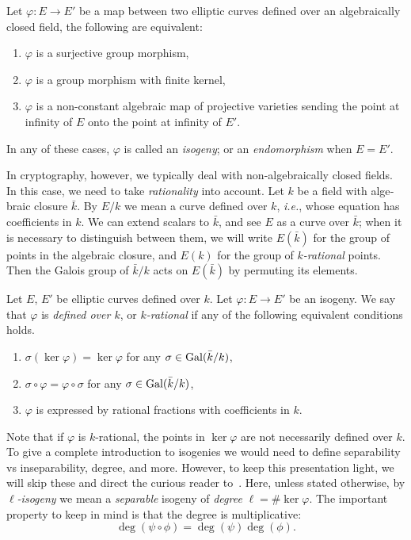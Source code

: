 \begin{otherlanguage}{english}
  \begin{definition}
    Let $\varphi:E\to E'$ be a map between two elliptic curves defined
    over an algebraically closed field, the following are equivalent:
    \begin{enumerate}
    \item $\varphi$ is a surjective group morphism,
    \item $\varphi$ is a group morphism with finite kernel,
    \item $\varphi$ is a non-constant algebraic map of projective
      varieties sending the point at infinity of $E$ onto the point at
      infinity of $E'$.
    \end{enumerate}
    In any of these cases, $\varphi$ is called an \emph{isogeny}; or
    an \emph{endomorphism} when $E=E'$.
  \end{definition}

  In cryptography, however, we typically deal with non-algebraically
  closed fields. In this case, we need to take \emph{rationality} into
  account. Let $k$ be a field with algebraic closure $\bar{k}$. By
  $E/k$ we mean a curve defined over $k$, \emph{i.e.}, whose equation
  has coefficients in $k$. We can extend scalars to $\bar{k}$, and see
  $E$ as a curve over $\bar{k}$; when it is necessary to distinguish
  between them, we will write $E(\bar{k})$ for the group of points in
  the algebraic closure, and $E(k)$ for the group of
  \emph{$k$-rational} points.  Then the Galois group of $\bar{k}/k$
  acts on $E(\bar{k})$ by permuting its elements.

  \begin{definition}
    Let $E$, $E'$ be elliptic curves defined over $k$. Let
    $\varphi:E\to E'$ be an isogeny. We say that $\varphi$ is
    \emph{defined over $k$}, or \emph{$k$-rational} if any of the
    following equivalent conditions holds.
    \begin{enumerate}
    \item $\sigma(\ker\varphi) = \ker\varphi$ for any
      $\sigma\in\mathrm{Gal}(\bar{k}/k)$,
    \item $\sigma\circ\varphi = \varphi\circ\sigma$ for any
      $\sigma\in\mathrm{Gal}(\bar{k}/k)$,
    \item $\varphi$ is expressed by rational fractions with
      coefficients in $k$.
    \end{enumerate}
  \end{definition}

  Note that if $\varphi$ is $k$-rational, the points in $\ker\varphi$
  are not necessarily defined over $k$. To give a complete
  introduction to isogenies we would need to define separability vs
  inseparability, degree, and more. However, to keep this presentation
  light, we will skip these and direct the curious reader
  to~\cite{silverman:elliptic,washington,milne2006,drew-course,defeo2017isogenybased}.
  Here, unless stated otherwise, by \emph{$\ell$-isogeny} we mean a
  \emph{separable} isogeny of \emph{degree} $\ell=\#\ker\varphi$. The
  important property to keep in mind is that the degree is
  multiplicative:
  \[\deg(\psi\circ\phi) = \deg(\psi)\deg(\phi).\]


\end{otherlanguage}

